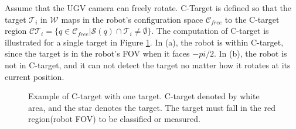 \documentclass[12pt,draftcls,onecolumn]{IEEEtran}
\begin{document}
Assume that the UGV camera can freely rotate.
C-Target is defined so that the target $\mathcal{T}_i$ in $\mathcal{W}$ maps  in the robot's configuration space  $\mathcal{C}_{free}$ to the C-target region  $\mathcal{CT}_i = \{q \in \mathcal{C}_{free}    |    \mathcal{S}(q) \cap \mathcal{T}_i  \neq  \emptyset \}$.
The computation of C-target is illustrated for a single target in Figure \ref{fig:4}.
In (a), the robot is within C-target, since the target is in the robot's FOV when it faces $-pi/2$.
In (b), the robot is not in C-target, and it can not detect the target no matter how it rotates at its current position. 



\begin{figure}[htp]
  \centering
  \quad
  \caption{Example of C-target with one target. C-target denoted by white area, and the star denotes the target. The target must fall in the red region(robot FOV) to be classified or measured.}
  \label{fig:4}
\end{figure}
\end{document}
